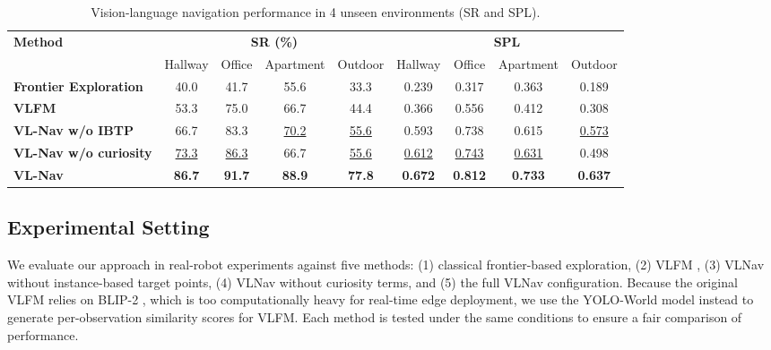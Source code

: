 \begin{table*}[ht]
\captionsetup{
    width=\textwidth,
    font=Smallfont,
    labelfont=Smallfont,
    textfont=Smallfont
    }
\caption{Vision-language navigation performance in 4 unseen environments (SR and SPL).}
\label{SOTAResults}
\centering
\begin{tabular}{lcccc|cccc}
\toprule
\multirow{2}{*}{\textbf{Method}} & \multicolumn{4}{c}{\textbf{SR (\%)}} & \multicolumn{4}{c}{\textbf{SPL}} \\
\cmidrule(lr){2-5} \cmidrule(lr){6-9}
 & Hallway & Office & Apartment & Outdoor & Hallway & Office & Apartment & Outdoor \\
\midrule
\textbf{Frontier Exploration}  
  & 40.0 & 41.7 & 55.6 & 33.3  
  & 0.239 & 0.317 & 0.363 & 0.189 \\

\textbf{VLFM} \cite{yokoyama2024vlfm}                 
  & 53.3 & 75.0 & 66.7 & 44.4  
  & 0.366 & 0.556 & 0.412 & 0.308 \\

\textbf{VL-Nav w/o IBTP}      
  & 66.7 & 83.3 & \underline{70.2} & \underline{55.6}  
  & 0.593 & 0.738 & 0.615 & \underline{0.573} \\

\textbf{VL-Nav w/o curiosity}      
  & \underline{73.3} & \underline{86.3} & 66.7 & \underline{55.6}  
  & \underline{0.612} & \underline{0.743} & \underline{0.631} & 0.498 \\

\textbf{VL-Nav}               
  & \textbf{86.7} & \textbf{91.7} & \textbf{88.9} & \textbf{77.8}  
  & \textbf{0.672} & \textbf{0.812} & \textbf{0.733} & \textbf{0.637} \\

\bottomrule
\end{tabular}
\end{table*}








\subsection{Experimental Setting}
\label{sec:experimental_setting}

We evaluate our approach in real-robot experiments against five methods: (1) classical frontier-based exploration, (2) VLFM \cite{yokoyama2024vlfm}, (3) VLNav without instance-based target points, (4) VLNav without curiosity terms, and (5) the full VLNav configuration. Because the original VLFM relies on BLIP-2 \cite{li2023blip}, which is too computationally heavy for real-time edge deployment, we use the YOLO-World \cite{cheng2024yolo} model instead to generate per-observation similarity scores for VLFM. Each method is tested under the same conditions to ensure a fair comparison of performance.

